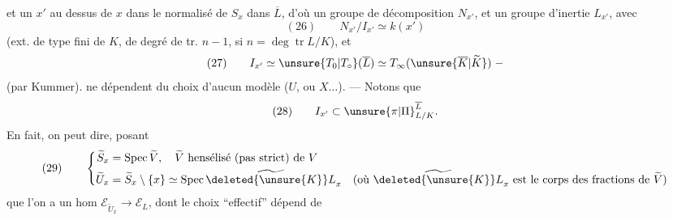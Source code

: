 et un $x'$ au dessus de $x$ dans le
normalisé de $S_x$ dans $\overline L$, d'où un
groupe de décomposition $N_{x'}$, et un
groupe d'inertie $L_{x'}$, avec
\[
(26)\qquad N_{x'}/I_{x'}\simeq k(x')
\]
(ext. de type fini de $K$, de degré de
tr. $n-1$, si $n=\deg\operatorname{tr}L/K$), et
\[
(27)\qquad I_{x'}\simeq\unsure{T_0|T_\circ}(\overline L)\simeq T_\infty(\unsure{\overline K|\widetilde K})\;-
\]
(par Kummer).  
ne dépendent du choix d'aucun
modèle ($U$, ou $X\ldots$). --- Notons que
\[
(28)\qquad I_{x'}\subset{\unsure{\pi|\Pi}}_{L/K}^{\overline L}.
\]
En fait, on peut dire, posant
\[
(29)\qquad\left\{\begin{aligned}
\widetilde S_x&=\operatorname{Spec}\widetilde V,\quad\widetilde V\text{ hensélisé (pas strict) de }V\\
\widetilde U_x&=\widetilde S_x\setminus\{x\}\simeq\operatorname{Spec}\widetilde{\deleted{\unsure{K}}L}_x\quad(\text{où }\widetilde{\deleted{\unsure{K}}L}_x\text{ est le corps des fractions de }\widetilde V)
\end{aligned}\right.
\]
que l'on a un hom  $\mathcal E_{\widetilde U_x}\longrightarrow\mathcal E_L$,
 dont le choix ``effectif'' dépend de
